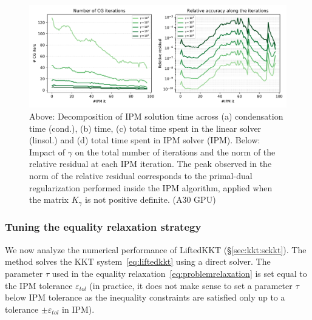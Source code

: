 \begin{figure}[!ht]
  \centering
  \includegraphics[width=\textwidth]{../figures/hybrid-gamma.pdf}
  \caption{
    Above: Decomposition of IPM solution time across
    (a) condensation time (cond.), (b) \CG time, (c) total time
    spent in the linear solver (linsol.) and (d) total time spent in
    IPM solver (IPM).
    Below: Impact of $\gamma$ on the total number of \CG iterations
    and the norm of the relative residual at each IPM iteration.
    The peak observed in the norm of the relative residual corresponds
    to the primal-dual regularization performed inside the IPM algorithm,
    applied when the matrix $K_\gamma$ is not positive definite.
    \label{fig:hybrid:gamma}
    (A30 GPU)
  }
\end{figure}


\subsubsection{Tuning the equality relaxation strategy}
We now analyze the numerical performance of LiftedKKT (\S\ref{sec:kkt:sckkt}).
The method solves the KKT system~\eqref{eq:liftedkkt} using a direct solver.
The parameter $\tau$ used in the equality relaxation~\eqref{eq:problemrelaxation}
is set equal to the IPM tolerance $\varepsilon_{tol}$ (in practice, it does not
make sense to set a parameter $\tau$ below IPM tolerance as the
inequality constraints are satisfied only up to a tolerance $\pm \varepsilon_{tol}$
in IPM).

